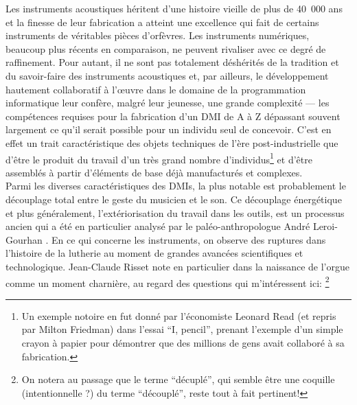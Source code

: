 \noindent Les instruments acoustiques héritent d'une histoire vieille de plus de 40~000 ans \cite{conard_new_2009} et la finesse de leur fabrication a atteint une excellence qui fait de certains instruments de véritables pièces d'orfèvres. Les instruments numériques, beaucoup plus récents en comparaison, ne peuvent rivaliser avec ce degré de raffinement. Pour autant, il ne sont pas totalement déshérités de la tradition et du savoir-faire des instruments acoustiques et, par ailleurs, le développement hautement collaboratif à l'œuvre dans le domaine de la programmation informatique leur confère, malgré leur jeunesse, une grande complexité — les compétences requises pour la fabrication d'un \gls{DMI} de A à Z dépassant souvent largement ce qu'il serait possible pour un individu seul de concevoir. C'est en effet un trait caractéristique des objets techniques de l'ère post-industrielle que d'être le produit du travail d'un très grand nombre d'individus\footnote{Un exemple notoire en fut donné par l'économiste Leonard Read (et repris par Milton Friedman) dans l'essai ``I, pencil''\cite{read_i_1958}, prenant l'exemple d'un simple crayon à papier pour démontrer que des millions de gens avait collaboré à sa fabrication.} et d'être assemblés à partir d'éléments de base déjà manufacturés et complexes.\\
\indent Parmi les diverses caractéristiques des \glspl{DMI}, la plus notable est probablement le découplage total entre le geste du musicien et le son. Ce découplage énergétique et plus généralement, l'extériorisation du travail dans les outils, est un processus ancien qui a été en particulier analysé par le paléo-anthropologue André Leroi-Gourhan \cite{leroi-gourhan_geste_1964}. En ce qui concerne les instruments, on observe des ruptures dans l'histoire de la lutherie au moment de grandes avancées scientifiques et technologique. Jean-Claude Risset note en particulier dans \cite{genevois_les_1999} la naissance de l'orgue comme un moment charnière, au regard des questions qui m'intéressent ici: \footnote{On notera au passage que le terme ``décuplé'', qui semble être une coquille (intentionnelle ?) du terme ``découplé'', reste tout à fait pertinent!}\\
